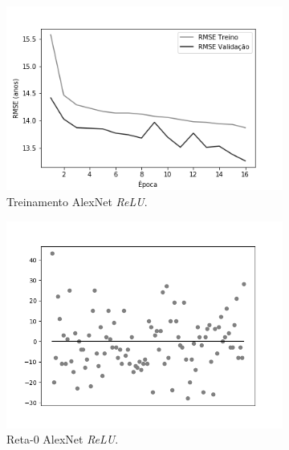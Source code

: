 	\begin{figure}[h!]
		\caption{Resultados do treinamento e teste da CNN AlexNet de acordo com a Abordagem 2.}\label{fig:alexnet-abordagem2}
		\begin{subfigure}[hb]{0.5\linewidth}
			\caption{Treinamento AlexNet \emph{ReLU}.}
			\includegraphics[width=\linewidth]{img/graficos/history/alexnet/fig-history-image-treat-2-alexnet-relu-rmse.png}
		\end{subfigure}
		\begin{subfigure}[hb]{0.5\linewidth}
			\caption{Reta-0 AlexNet \emph{ReLU}.}
			\includegraphics[width=\linewidth]{img/graficos/reta0/alexnet/fig-reta-0-image-treat-2-alexnet-relu.png}%
		\end{subfigure}\\
		\begin{subfigure}[hb]{0.5\linewidth}

\end{subfigure}
\end{figure}
